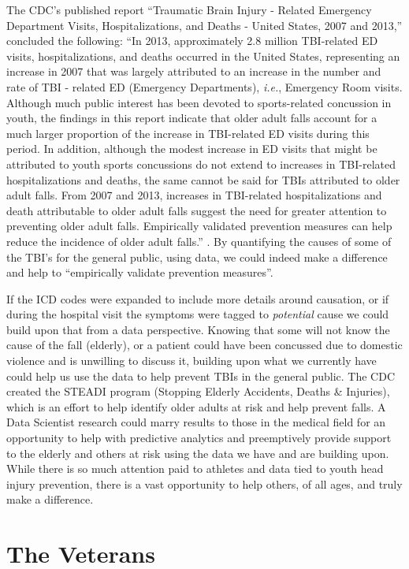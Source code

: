 \documentclass[sigconf]{acmart}
\begin{document}
The CDC's published report ``Traumatic Brain Injury - Related Emergency Department Visits, Hospitalizations, and Deaths - United States, 2007 and 2013,'' concluded the following: ``In 2013, approximately 2.8 million TBI-related ED visits, hospitalizations, and deaths occurred in the United States, representing an increase in 2007 that was largely attributed to an increase in the number and rate of TBI - related ED (Emergency Departments), {\em i.e.}, Emergency Room visits.  Although much public interest has been devoted to sports-related concussion in youth, the findings in this report indicate that older adult falls account for a much larger proportion of the increase in TBI-related ED visits during this period.  In addition, although the modest increase in ED visits that might be attributed to youth sports concussions do not extend to increases in TBI-related hospitalizations and deaths, the same cannot be said for TBIs attributed to older adult falls.  From 2007 and 2013, increases in TBI-related hospitalizations and death attributable to older adult falls suggest the need for greater attention to preventing older adult falls.  Empirically validated prevention measures can help reduce the incidence of older adult falls.'' \cite{www-cdc-gov}.  By quantifying the causes of some of the TBI's for the general public, using data, we could indeed make a difference and help to ``empirically validate prevention measures''.

If the ICD codes were expanded to include more details around causation, or if during the hospital visit the symptoms were tagged to {\em potential} cause we could build upon that from a data perspective.  Knowing that some will not know the cause of the fall (elderly), or a patient could have been concussed due to domestic violence and is unwilling to discuss it, building upon what we currently have could help us use the data to help prevent TBIs in the general public.  The CDC created the STEADI program (Stopping Elderly Accidents, Deaths & Injuries), which is an effort to help identify older adults at risk and help prevent falls.  A Data Scientist research could marry results to those in the medical field for an opportunity to help with predictive analytics and preemptively provide support to the elderly and others at risk using the data we have and are building upon.  While there is so much attention paid to athletes and data tied to youth head injury prevention, there is a vast opportunity to help others, of all ages, and truly make a difference.  

\section{The Veterans}
\end{document}
